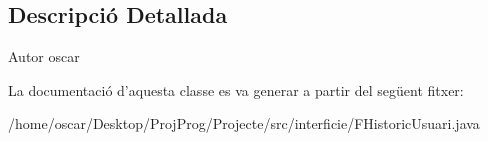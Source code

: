 \subsection{Descripció Detallada}
\begin{DoxyAuthor}{Autor}
oscar 
\end{DoxyAuthor}


La documentació d'aquesta classe es va generar a partir del següent fitxer\+:\begin{DoxyCompactItemize}
\item 
/home/oscar/\+Desktop/\+Proj\+Prog/\+Projecte/src/interficie/F\+Historic\+Usuari.\+java\end{DoxyCompactItemize}
